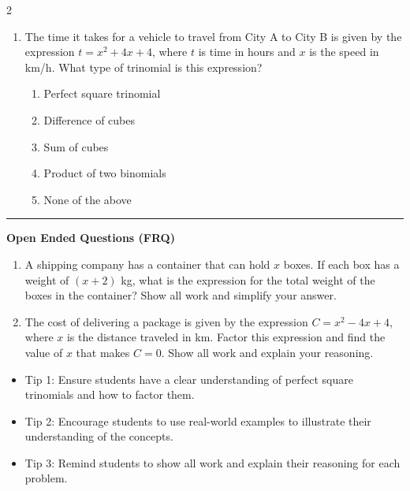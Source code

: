 \documentclass[10pt]{article}
\begin{document}
\begin{multicols}{2}
\begin{enumerate}[label=\textbf{Q\arabic*.}, leftmargin=*, itemsep=6pt, parsep=0pt]
  \item \small The time it takes for a vehicle to travel from City A to City B is given by the expression $t = x^2 + 4x + 4$, where $t$ is time in hours and $x$ is the speed in km/h. What type of trinomial is this expression?
  \begin{enumerate}[label=(\Alph*), leftmargin=0.6cm, nosep, itemsep=2pt]
    \item Perfect square trinomial
    \item Difference of cubes
    \item Sum of cubes
    \item Product of two binomials
    \item None of the above
  \end{enumerate}

\end{enumerate}
\end{multicols}

\vspace{-0.2cm}
\hrule
\vspace{0.2cm}
\textbf{\small Open Ended Questions (FRQ)}
\begin{enumerate}[label=\textbf{Q\arabic*.}, start=9, itemsep=5pt, topsep=0pt]

  \item \small A shipping company has a container that can hold $x$ boxes. If each box has a weight of $(x + 2)$ kg, what is the expression for the total weight of the boxes in the container? Show all work and simplify your answer. \vspace{2cm}

  \item \small The cost of delivering a package is given by the expression $C = x^2 - 4x + 4$, where $x$ is the distance traveled in km. Factor this expression and find the value of $x$ that makes $C = 0$. Show all work and explain your reasoning. \vspace{2cm}

\end{enumerate}

\vfill

\begin{tcolorbox}[colback=blue!5, colframe=mainblue!50, title=\small \textbf{Chef's Tips}, fonttitle=\bfseries, bottom=1mm]
\begin{itemize}[noitemsep, topsep=2pt, leftmargin=0.5cm]
  \item \scriptsize Tip 1: Ensure students have a clear understanding of perfect square trinomials and how to factor them.\item \scriptsize Tip 2: Encourage students to use real-world examples to illustrate their understanding of the concepts.\item \scriptsize Tip 3: Remind students to show all work and explain their reasoning for each problem.
\end{itemize}
\end{tcolorbox}
\end{document}
